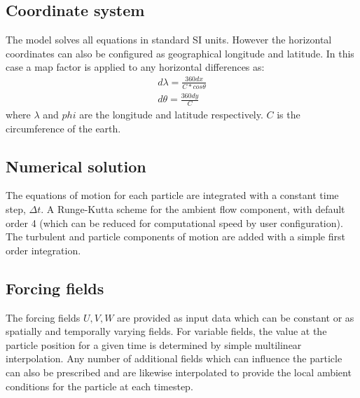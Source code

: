 \documentclass[a4paper]{article}
\begin{document}
\subsection{Coordinate system}
The model solves all equations in standard SI units.
However the horizontal coordinates can also be configured as geographical longitude and latitude.
In this case a map factor is applied to any horizontal differences as:
\begin{align}
d\lambda = \frac{360dx}{C*cos{\theta}} \\
d\theta = \frac{360dy}{C}
\end{align}
where $\lambda$ and $phi$ are the longitude and latitude respectively. $C$ is the circumference of the earth.

\subsection{Numerical solution}
The equations of motion for each particle are integrated with a constant time step, $\Delta t$.
A Runge-Kutta scheme for the ambient flow component, with default order 4 (which can be reduced for computational speed by user configuration).
The turbulent and particle components of motion are added with a simple first order integration.

\subsection{Forcing fields}
The forcing fields $U,V,W$ are provided as input data which can be constant or as spatially and temporally varying fields.
For variable fields, the value at the particle position for a given time is determined by simple multilinear interpolation.
Any number of additional fields which can influence the particle can also be prescribed and are likewise interpolated to provide the local ambient conditions for the particle at each timestep.
\end{document}
